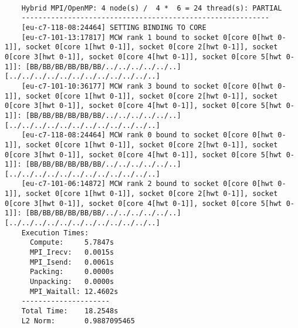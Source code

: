 \documentclass[11pt,a4paper]{article}
\begin{document}
\begin{lstlisting}
	
	Hybrid MPI/OpenMP: 4 node(s) /  4 *  6 = 24 thread(s): PARTIAL 
	-----------------------------------------------------------
	[eu-c7-118-08:24464] SETTING BINDING TO CORE
	[eu-c7-101-13:17817] MCW rank 1 bound to socket 0[core 0[hwt 0-1]], socket 0[core 1[hwt 0-1]], socket 0[core 2[hwt 0-1]], socket 0[core 3[hwt 0-1]], socket 0[core 4[hwt 0-1]], socket 0[core 5[hwt 0-1]]: [BB/BB/BB/BB/BB/BB/../../../../../..][../../../../../../../../../../../..]
	[eu-c7-101-10:36177] MCW rank 3 bound to socket 0[core 0[hwt 0-1]], socket 0[core 1[hwt 0-1]], socket 0[core 2[hwt 0-1]], socket 0[core 3[hwt 0-1]], socket 0[core 4[hwt 0-1]], socket 0[core 5[hwt 0-1]]: [BB/BB/BB/BB/BB/BB/../../../../../..][../../../../../../../../../../../..]
	[eu-c7-118-08:24464] MCW rank 0 bound to socket 0[core 0[hwt 0-1]], socket 0[core 1[hwt 0-1]], socket 0[core 2[hwt 0-1]], socket 0[core 3[hwt 0-1]], socket 0[core 4[hwt 0-1]], socket 0[core 5[hwt 0-1]]: [BB/BB/BB/BB/BB/BB/../../../../../..][../../../../../../../../../../../..]
	[eu-c7-101-06:14872] MCW rank 2 bound to socket 0[core 0[hwt 0-1]], socket 0[core 1[hwt 0-1]], socket 0[core 2[hwt 0-1]], socket 0[core 3[hwt 0-1]], socket 0[core 4[hwt 0-1]], socket 0[core 5[hwt 0-1]]: [BB/BB/BB/BB/BB/BB/../../../../../..][../../../../../../../../../../../..]
	Execution Times:
	  Compute:     5.7847s
	  MPI_Irecv:   0.0015s
	  MPI_Isend:   0.0061s
	  Packing:     0.0000s
	  Unpacking:   0.0000s
	  MPI_Waitall: 12.4602s
	---------------------
	Total Time:    18.2548s
	L2 Norm:       0.9887095465
	

\end{lstlisting}
\end{document}
